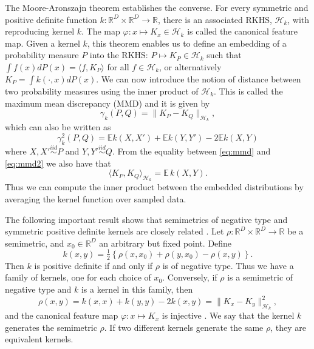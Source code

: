 \documentclass[aps,preprint,nofootinbib,floatfix]{revtex4-1}
\def\E{\mathbb{E}}
\begin{document}
The Moore-Aronszajn theorem establishes the converse. For every symmetric
and positive definite function $k: \mathbb{R}^D\times \mathbb{R}^D \to
\mathbb{R}$, there is an associated RKHS, $\mathcal{H}_k$, with reproducing
kernel $k$. The map $\varphi: x \mapsto K_x \in \mathcal{H}_k$ is called
the canonical feature map. Given a kernel $k$,
this theorem enables us to define an embedding of a probability measure
$P$ into the RKHS: $P \mapsto K_P \in
\mathcal{H}_k$ such that 
$\int f(x) d P(x) = \langle f, K_P \rangle$ for all $f \in \mathcal{H}_k$,
or alternatively $K_P = \int k(\cdot, x)  d P(x)$. 
We can now  introduce the 
notion of distance between two probability measures using the inner product
of $\mathcal{H}_k$. This is called the maximum mean discrepancy (MMD) and
it is given by
\begin{equation}\label{eq:mmd}
\gamma_k(P,Q) = \| K_P - K_Q \|_{\mathcal{H}_k},
\end{equation}
which can also be written as \cite{Gretton2012}
\begin{equation}\label{eq:mmd2}
\gamma_k^2(P,Q) = \E k(X,X') + \E k(Y,Y') - 2 \E k(X, Y)
\end{equation}
where $X,X' \stackrel{iid}{\sim} P$ and $Y,Y'\stackrel{iid}{\sim} Q$.
From the equality between \eqref{eq:mmd} and \eqref{eq:mmd2} we also
have that
\begin{equation}\label{eq:inner_data}
\langle K_P, K_Q \rangle_{\mathcal{H}_k} = \E \, k(X, Y).
\end{equation}
Thus we can compute the inner product between the embedded distributions 
by averaging the kernel function over sampled data.

The following important result shows that semimetrics of negative
type and symmetric positive definite kernels are closely related
\cite{Berg1984}. Let $\rho: \mathbb{R}^D \times \mathbb{R}^D \to \mathbb{R}$
be a semimetric, 
and $x_0 \in \mathbb{R}^D$ an arbitrary but fixed point.
Define
\begin{equation}\label{eq:kernel_semimetric}
k(x,y) = \tfrac{1}{2} \left\{  \rho(x,x_0) + \rho(y,x_0) - \rho(x,y)\right\}.
\end{equation}
Then $k$ is positive definite if and only if $\rho$ is of negative type.
Thus we have a family of kernels, one for each choice of $x_0$. Conversely,
if $\rho$ is a semimetric of negative type and $k$ is a kernel in this
family, then 
\begin{equation}\label{eq:gen_kernel}
\rho(x,y) = k(x,x) + k(y,y) -2k(x,y) = \| K_x - K_y
\|^2_{\mathcal{H}_k},
\end{equation}
and the canonical feature map 
$\varphi: x \mapsto K_x$ is injective \cite{Sejdinovic2013}.
We say that the kernel $k$ generates the semimetric $\rho$. 
If two different kernels generate the same $\rho$, they are
equivalent kernels.
\end{document}
